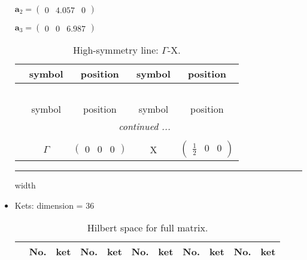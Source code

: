 \documentclass[fleqn,10pt,landscape]{article}
\begin{document}
\begin{itemize}
\quad $\bm{a}_2=\begin{pmatrix} 0 & 4.057 & 0 \end{pmatrix}$

\quad $\bm{a}_3=\begin{pmatrix} 0 & 0 & 6.987 \end{pmatrix}$

\begin{center}
\renewcommand{\arraystretch}{1.3}
\begin{longtable}{c|cc|cc}
\caption{High-symmetry line: $\Gamma$-X.}
 \\
 \hline \hline
 & symbol & position & symbol & position \\ \hline \endfirsthead

\multicolumn{4}{l}{\tablename\ \thetable{}} \\
 \hline \hline
 & symbol & position & symbol & position \\ \hline \endhead

 \hline \hline
\multicolumn{4}{r}{\footnotesize\it continued ...} \\ \endfoot

 \hline \hline
\multicolumn{4}{r}{} \\ \endlastfoot

 & $\Gamma$ & $\begin{pmatrix} 0 & 0 & 0 \end{pmatrix}$ & X & $\begin{pmatrix} \frac{1}{2} & 0 & 0 \end{pmatrix}$ \\
\end{longtable}
\end{center}

 \hfil \hrule height 1mm width \textwidth \hfil

\item Kets: dimension = 36
\begin{center}
\renewcommand{\arraystretch}{1.3}
\begin{longtable}{c|cc|cc|cc|cc|cc}
\caption{Hilbert space for full matrix.}
 \\
 \hline \hline
 & No. & ket & No. & ket & No. & ket & No. & ket & No. & ket \\ \hline \endfirsthead


\end{longtable}
\end{center}
\end{itemize}
\end{document}
